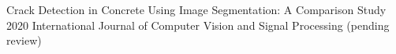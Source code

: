 


\begin{cventries}

  \cventry
    {Crack Detection in Concrete Using Image Segmentation:  A Comparison Study} %
    {} %
    {} %
    {2020} %
    {International Journal of Computer Vision and Signal Processing (pending review)}
    


\end{cventries}